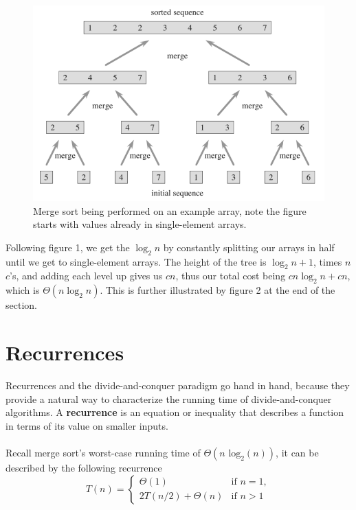 \documentclass{article}
\begin{document}
\begin{figure}[ht]
\centering
\includegraphics[scale=0.5]{merge}
\caption{
Merge sort being performed on an example array, note the figure starts with values already in single-element arrays.
}
\label{fig:merge_sort}
\end{figure}

Following figure 1, we get the $\log_2{n}$ by constantly splitting our arrays in half until we get to single-element arrays. The height of the tree is $\log_2{n} + 1$, times $n$ $c$'s, and adding each level up gives us $cn$, thus our total cost being $cn \log_2{n} + cn$, which is $\Theta{(n \log_2 n)}$. This is further illustrated by figure 2 at the end of the section.

\newpage
\section*{Recurrences}
Recurrences and the divide-and-conquer paradigm go hand in hand, because they provide a natural way to characterize the running time of divide-and-conquer algorithms. A \textbf{recurrence} is an equation or inequality that describes a function in terms of its value on smaller inputs. 
\\ \\
Recall merge sort's worst-case running time of $\Theta{(n\text{ log}_2(n))}$, it can be described by the following recurrence\\
$$
T(n)=
\begin{cases}
\Theta(1) & \text{if } n = 1,\\
2T(n/2) + \Theta{(n)} & \text{if } n > 1
\end{cases}
$$
\end{document}
